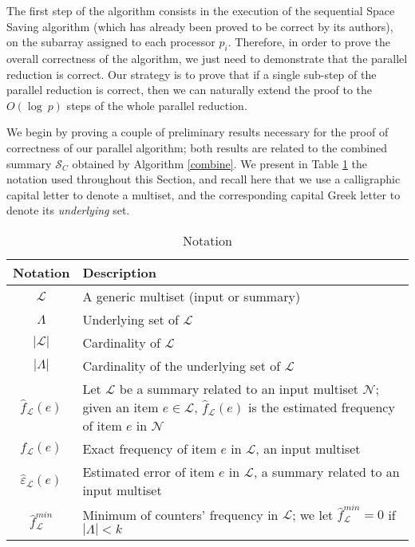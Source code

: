 \documentclass[final,3p,times]{elsarticle}
\begin{document}
The first step of the algorithm consists in the execution of the sequential Space Saving algorithm (which has already been proved to be correct by its authors),  on the subarray
assigned to each processor $p_{i}$. Therefore, in order to prove the overall correctness of the algorithm, we just need to demonstrate that the parallel reduction is correct.
Our strategy is to prove that if a single sub-step of the parallel reduction is correct, then we can naturally extend the proof to the $O(\log~p)$ steps of the whole parallel reduction.

We begin by proving a couple of preliminary results necessary for the proof of correctness of our parallel algorithm; both results are related to the combined summary $\mathcal{S}_C$ obtained by Algorithm \ref{combine}. We present in Table \ref{notation} the notation used throughout this Section, and recall here that we use a calligraphic capital letter to denote a multiset, and the corresponding capital Greek letter to denote its \textit{underlying} set.

\begin{table}
\renewcommand{\arraystretch}{1.3}
 \caption{Notation}
      \label{notation}
	\centering
    \begin{tabularx}{\textwidth}{@{} |c|X| @{}}
    \hline
    Notation & Description  \\ \hline \hline
    $\mathcal{L}$ &  A generic multiset (input or summary) \\ \hline
    $\Lambda$ & Underlying set of  $\mathcal{L}$  \\ \hline
    $\left\vert{\mathcal{L}}\right\vert$ & Cardinality of $\mathcal{L}$ \\ \hline
    $\left\vert{\Lambda}\right\vert$ & Cardinality of the underlying set of $\mathcal{L}$ \\ \hline
    $\hat{f}_{\mathcal{L}}(e)$ & Let $\mathcal{L}$ be a summary related to an input multiset $\mathcal{N}$; given an item $e \in \mathcal{L}$, $\hat{f}_{\mathcal{L}}(e)$ is the estimated frequency of item $e$ in $\mathcal{N}$ \\ \hline
    $f_{\mathcal{L}}(e)$ & Exact frequency of item $e$ in $\mathcal{L}$, an input multiset\\ \hline
    $\hat{\varepsilon}_{\mathcal{L}}(e)$ & Estimated 
    error of item $e$ in $\mathcal{L}$, a summary related to an input multiset \\ \hline
    $\hat{f}_{\mathcal{L}}^{min}$ & Minimum of counters' frequency in $\mathcal{L}$; we let $\hat{f}_{\mathcal{L}}^{min} = 0$ if $\left\vert{\Lambda}\right\vert < k$ \\ \hline
    \end{tabularx}
    \end{table}
\end{document}
